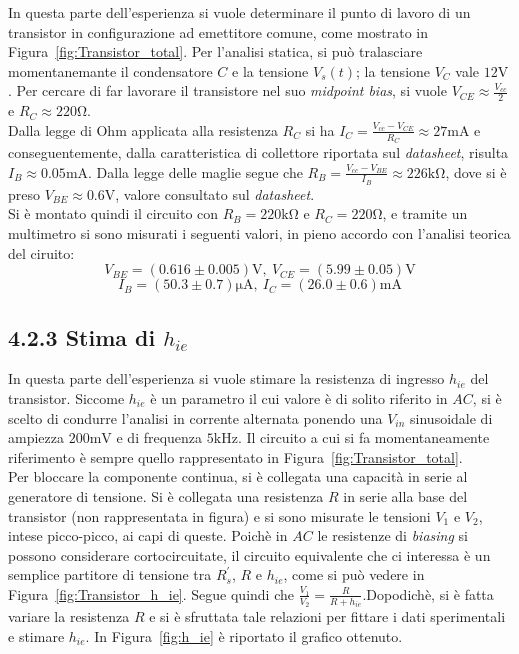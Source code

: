 \documentclass{article}
\begin{document}
In questa parte dell'esperienza si vuole determinare il punto di lavoro di un transistor in configurazione ad emettitore comune, come mostrato in Figura~\ref{fig:Transistor_total}. Per l'analisi statica, si può tralasciare momentanemante il condensatore $C$ e la tensione $V_{s}(t)$; la tensione $V_{C}$ vale $12 \si{\volt}$. Per cercare di far lavorare il transistore nel suo \textit{midpoint bias}, si vuole $V_{CE} \approx \frac{V_{cc}}{2}$ e $R_{C} \approx 220 \si{\ohm}$.\\
Dalla legge di Ohm applicata alla resistenza $R_{C}$ si ha $I_{C} = \frac{V_{cc}-V_{CE}}{R_{C}} \approx 27 \si{\milli\ampere}$ e conseguentemente, dalla caratteristica di collettore riportata sul \textit{datasheet}, risulta $I_{B} \approx 0.05 \si{\milli\ampere}$. Dalla legge delle maglie segue che $R_{B} = \frac{V_{cc}-V_{BE}}{I_{B}} \approx 226 \si{\kilo\ohm}$, dove si è preso $V_{BE} \approx 0.6 \si{\volt}$, valore consultato sul \textit{datasheet}.\\
Si è montato quindi il circuito con $R_{B} = 220 \si{\kilo\ohm}$ e $R_{C} = 220 \si{\ohm}$, e tramite un multimetro si sono misurati i seguenti valori, in pieno accordo con l'analisi teorica del ciruito:
\[ V_{BE} = (0.616 \pm 0.005) \si{\volt} , \ V_{CE} = (5.99 \pm 0.05) \si{\volt} \]
\[ I_{B} = (50.3 \pm 0.7) \si{\micro\ampere} , \ I_{C} = (26.0 \pm 0.6) \si{\milli\ampere} \]


\subsection*{4.2.3  Stima di $h_{ie}$}

In questa parte dell'esperienza si vuole stimare la resistenza di ingresso $h_{ie}$ del transistor. Siccome $h_{ie}$ è un parametro il cui valore è di solito riferito in $AC$, si è scelto di condurre l'analisi in corrente alternata ponendo una $V_{in}$ sinusoidale di ampiezza $200 \si{\milli\volt}$ e di frequenza $5\si{\kilo\hertz}$. Il circuito a cui si fa momentaneamente riferimento è sempre quello rappresentato in Figura~\ref{fig:Transistor_total}.\\
 Per bloccare la componente continua, si è collegata una capacità in serie al generatore di tensione. Si è collegata una resistenza $R$ in serie alla base del transistor (non rappresentata in figura) e si sono misurate le tensioni $V_{1}$ e $V_{2}$, intese picco-picco, ai capi di queste. Poichè in $AC$ le resistenze di \textit{biasing} si possono considerare cortocircuitate, il circuito equivalente che ci interessa è un semplice partitore di tensione tra $R_{s}^{'}$, $R$ e $h_{ie}$, come si può vedere in Figura~\ref{fig:Transistor_h_ie}. Segue quindi che $\frac{V_{1}}{V_{2}} = \frac{R}{R+h_{ie}}$.Dopodichè, si è fatta variare la resistenza $R$ e si è sfruttata tale relazioni per fittare i dati sperimentali e stimare $h_{ie}$. In Figura~\ref{fig:h_ie} è riportato il grafico ottenuto.\\
\end{document}
